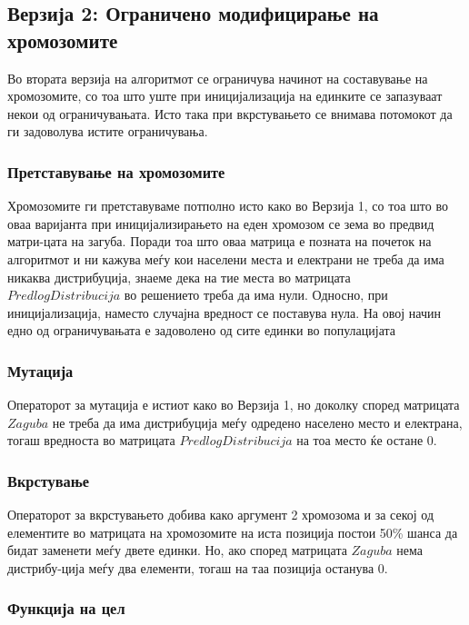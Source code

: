 \documentclass{article}
\begin{document}
\subsection{Верзија 2: Ограничено модифицирање на хромозомите}

Во втората верзија на алгоритмот се ограничува начинот на составување на хромозомите, со тоа што уште при иницијализација на единките се запазуваат некои од ограничувањата. Исто така при вкрстувањето се внимава потомокот да ги задоволува истите ограничувања.

\subsubsection{Претставување на хромозомите}

Хромозомите ги претставуваме потполно исто како во Верзија 1, со тоа што во оваа варијанта при иницијализирањето на еден хромозом се зема во предвид матри-цата на загуба. Поради тоа што оваа матрица е позната на почеток на алгоритмот и ни кажува меѓу кои населени места и електрани не треба да има никаква дистрибуција, знаеме дека на тие места во матрицата $PredlogDistribucija$ во решението треба да има нули. Односно, при иницијализација, наместо случајна вредност се поставува нула. На овој начин едно од ограничувањата е задоволено од сите единки во популацијата

\subsubsection{Мутација}

Операторот за мутација е истиот како во Верзија 1, но доколку според матрицата $Zaguba$ не треба да има дистрибуција меѓу одредено населено место и електрана, тогаш вредноста во матрицата $PredlogDistribucija$ на тоа место ќе остане 0.
 
\subsubsection{Вкрстување}

Операторот за вкрстувањето добива како аргумент 2 хромозома и за секој од елементите во матрицата на хромозомите на иста позиција постои 50\% шанса да бидат заменети меѓу двете единки. Но, ако според матрицата $Zaguba$ нема дистрибу-ција меѓу два елементи, тогаш на таа позиција останува 0.
 
\subsubsection{Функција на цел}
\end{document}
